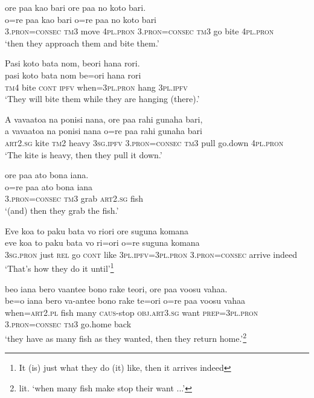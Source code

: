 \newpage
\ea\label{ex:text27-17}
ore paa kao bari ore paa no koto bari.\\
\gll o=re	paa	kao	bari	o=re	paa	no	koto	bari\\
     3.\textsc{pron}=\textsc{consec}	\textsc{tm}3	move	4\textsc{pl}.\textsc{pron}	3.\textsc{pron}=\textsc{consec}	\textsc{tm}3	go	bite	4\textsc{pl}.\textsc{pron}\\
\glt `then they approach them and bite them.'
\z

\ea\label{ex:text27-18}
Pasi koto bata nom, beori hana rori.\\
\gll pasi	koto	bata	nom	be=ori	hana	rori\\
     \textsc{tm}4	bite	\textsc{cont}	\textsc{ipfv}	when=3\textsc{pl}.\textsc{pron}	hang	3\textsc{pl}.\textsc{ipfv}\\
\glt `They will bite them while they are hanging (there).'
\z

\ea\label{ex:text27-19}
A vavaatoa na ponisi nana, ore paa rahi gunaha bari,\\
\gll a	vavaatoa	na	ponisi	nana	o=re	paa	rahi	gunaha	bari\\
     \textsc{art}2.\textsc{sg}	kite	\textsc{tm}2	heavy	3\textsc{sg}.\textsc{ipfv}	3.\textsc{pron}=\textsc{consec}	\textsc{tm}3	pull	go.down	4\textsc{pl}.\textsc{pron}\\
\glt `The kite is heavy, then they pull it down.'
\z

\ea\label{ex:text27-20}
ore paa ato bona iana.\\
\gll o=re	paa	ato	bona	iana\\
     3.\textsc{pron}=\textsc{consec}	\textsc{tm}3	grab	\textsc{art}2.\textsc{sg}	fish\\
\glt `(and) then they grab the fish.'
\z

\ea\label{ex:text27-21}
Eve koa to paku bata vo riori ore suguna komana\\
\gll eve	koa	to	paku	bata	vo	ri=ori	o=re	suguna	komana\\
     3\textsc{sg}.\textsc{pron}	just	\textsc{rel}	go	\textsc{cont}	like	3\textsc{pl}.\textsc{ipfv}=3\textsc{pl}.\textsc{pron}	3.\textsc{pron}=\textsc{consec}	arrive	indeed\\
\glt `That's how they do it until'\footnote{It (is) just what they do (it) like, then it arrives indeed}
\z

\ea\label{ex:text27-22}
beo iana bero vaantee bono rake teori, ore paa voosu vahaa.\\
\gll be=o	iana	bero	va-antee	bono	rake	te=ori	o=re	paa	voosu	vahaa\\
     when=\textsc{art}2.\textsc{pl}	fish	many	\textsc{caus}-stop	\textsc{obj}.\textsc{art}3.\textsc{sg}	want	\textsc{prep}=3\textsc{pl}.\textsc{pron}	3.\textsc{pron}=\textsc{consec}	\textsc{tm}3	go.home	back\\
\glt `they have as many fish as they wanted, then they return home.'\footnote{lit. `when many fish make stop their want ...'}
\z

